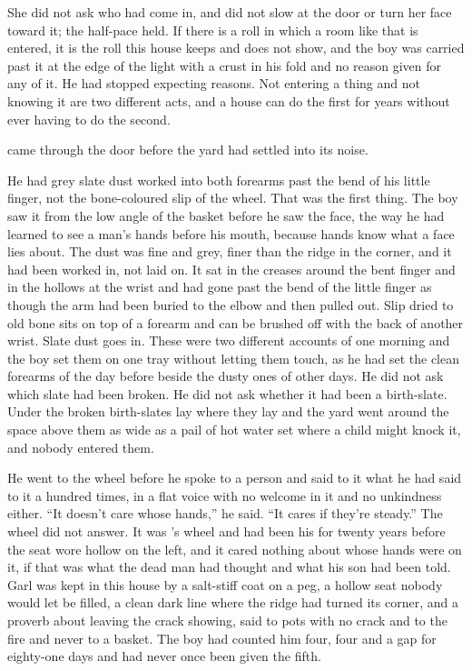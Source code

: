 She did not ask who had come in, and did not slow at the door or turn her face toward it; the half-pace held. If there is a roll in which a room like that is entered, it is the roll this house keeps and does not show, and the boy was carried past it at the edge of the light with a crust in his fold and no reason given for any of it. He had stopped expecting reasons. Not entering a thing and not knowing it are two different acts, and a house can do the first for years without ever having to do the second.

\scenebreak

 came through the door before the yard had settled into its noise.

He had grey slate dust worked into both forearms past the bend of his little finger, not the bone-coloured slip of the wheel. That was the first thing. The boy saw it from the low angle of the basket before he saw the face, the way he had learned to see a man's hands before his mouth, because hands know what a face lies about. The dust was fine and grey, finer than the ridge in the corner, and it had been worked in, not laid on. It sat in the creases around the bent finger and in the hollows at the wrist and had gone past the bend of the little finger as though the arm had been buried to the elbow and then pulled out. Slip dried to old bone sits on top of a forearm and can be brushed off with the back of another wrist. Slate dust goes in. These were two different accounts of one morning and the boy set them on one tray without letting them touch, as he had set the clean forearms of the day before beside the dusty ones of other days. He did not ask which slate had been broken. He did not ask whether it had been a birth-slate. Under  the broken birth-slates lay where they lay and the yard went around the space above them as wide as a pail of hot water set where a child might knock it, and nobody entered them.

He went to the wheel before he spoke to a person and said to it what he had said to it a hundred times, in a flat voice with no welcome in it and no unkindness either. “It doesn't care whose hands,” he said. “It cares if they're steady.” The wheel did not answer. It was 's wheel and had been his for twenty years before the seat wore hollow on the left, and it cared nothing about whose hands were on it, if that was what the dead man had thought and what his son had been told. Garl was kept in this house by a salt-stiff coat on a peg, a hollow seat nobody would let be filled, a clean dark line where the  ridge had turned its corner, and a proverb about leaving the crack showing, said to pots with no crack and to the fire and never to a basket. The boy had counted him four, four and a gap for eighty-one days and had never once been given the fifth.

